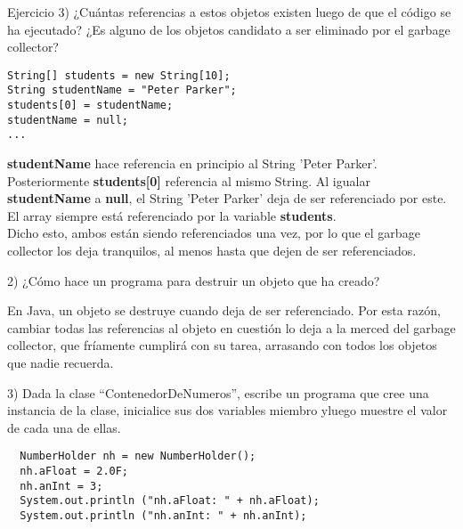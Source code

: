 \documentclass[12pt,letterpaper, onecolumn]{exam}
\begin{document}
\begin{questions}
\begin{solution}
    \end{solution}

    \question[] Ejercicio 3)   ¿Cuántas referencias a estos objetos
existen luego de que el código se ha ejecutado? ¿Es alguno de los objetos candidato a
ser eliminado por el garbage collector?

  \begin{verbatim}
String[] students = new String[10];
String studentName = "Peter Parker";
students[0] = studentName;
studentName = null;
...
  \end{verbatim}    
    \begin{solution}
      \textbf{studentName} hace referencia en principio al String 'Peter Parker'. Posteriormente \textbf{students[0]} referencia al mismo String. Al igualar \textbf{studentName} a \textbf{null}, el String 'Peter Parker' deja de ser referenciado por este. El array siempre está referenciado por la variable \textbf{students}. \\ 
      Dicho esto, ambos están siendo referenciados una vez, por lo que el garbage collector los deja tranquilos, al menos hasta que dejen de ser referenciados.
    \end{solution}

  2) ¿Cómo hace un programa para destruir  un objeto que ha creado?

  \begin{solution}
    En Java, un objeto se destruye cuando deja de ser referenciado. Por esta razón, cambiar todas las referencias al objeto en cuestión lo deja a la merced del garbage collector, que fríamente cumplirá con su tarea, arrasando con todos los objetos que nadie recuerda.
  \end{solution}

3) Dada la clase “ContenedorDeNumeros”, escribe un programa que
cree una instancia de la clase, inicialice sus dos variables miembro yluego muestre el valor de cada una de ellas.

\begin{solution}
  \begin{verbatim}
  NumberHolder nh = new NumberHolder();
  nh.aFloat = 2.0F;
  nh.anInt = 3;
  System.out.println ("nh.aFloat: " + nh.aFloat);
  System.out.println ("nh.anInt: " + nh.anInt);
  \end{verbatim}
\end{solution}
    
\end{questions}
\end{document}
